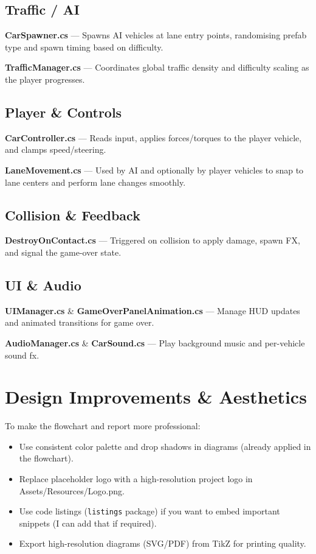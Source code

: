 \documentclass[12pt, a4paper]{article}
\begin{document}
\subsection{Traffic / AI}
\textbf{CarSpawner.cs} --- Spawns AI vehicles at lane entry points, randomising prefab type and spawn timing based on difficulty.

\textbf{TrafficManager.cs} --- Coordinates global traffic density and difficulty scaling as the player progresses.

\subsection{Player 
\& Controls}
\textbf{CarController.cs} --- Reads input, applies forces/torques to the player vehicle, and clamps speed/steering.

\textbf{LaneMovement.cs} --- Used by AI and optionally by player vehicles to snap to lane centers and perform lane changes smoothly.

\subsection{Collision \& Feedback}
\textbf{DestroyOnContact.cs} --- Triggered on collision to apply damage, spawn FX, and signal the game-over state.

\subsection{UI \& Audio}
\textbf{UIManager.cs} \& \textbf{GameOverPanelAnimation.cs} --- Manage HUD updates and animated transitions for game over.

\textbf{AudioManager.cs} \& \textbf{CarSound.cs} --- Play background music and per-vehicle sound fx.

\section{Design Improvements \& Aesthetics}
To make the flowchart and report more professional:
\begin{itemize}
  \item Use consistent color palette and drop shadows in diagrams (already applied in the flowchart).
  \item Replace placeholder logo with a high-resolution project logo in Assets/Resources/Logo.png.
  \item Use code listings (\texttt{listings} package) if you want to embed important snippets (I can add that if required).
  \item Export high-resolution diagrams (SVG/PDF) from TikZ for printing quality.
\end{itemize}
\end{document}
